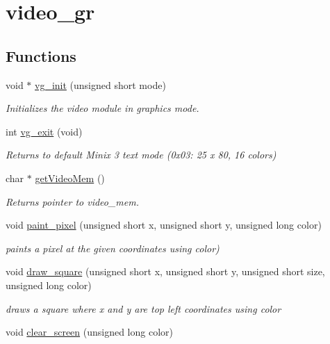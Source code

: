 \hypertarget{group__video__gr}{}\section{video\+\_\+gr}
\label{group__video__gr}
\subsection*{Functions}
\begin{DoxyCompactItemize}
\item 
void $\ast$ \hyperlink{group__video__gr_gacef21667c79365d57a084bed994c2189}{vg\+\_\+init} (unsigned short mode)
\begin{DoxyCompactList}\small\item\em Initializes the video module in graphics mode. \end{DoxyCompactList}\item 
int \hyperlink{group__video__gr_ga42f593e6656f1a978315aff02b1bcebf}{vg\+\_\+exit} (void)
\begin{DoxyCompactList}\small\item\em Returns to default Minix 3 text mode (0x03\+: 25 x 80, 16 colors) \end{DoxyCompactList}\item 
char $\ast$ \hyperlink{group__video__gr_ga225d3021cc002418d0191c705c9f7def}{get\+Video\+Mem} ()
\begin{DoxyCompactList}\small\item\em Returns pointer to video\+\_\+mem. \end{DoxyCompactList}\item 
void \hyperlink{group__video__gr_gab24ff8cf2062dab06f49c80bb6ea0d0b}{paint\+\_\+pixel} (unsigned short x, unsigned short y, unsigned long color)
\begin{DoxyCompactList}\small\item\em paints a pixel at the given coordinates using color) \end{DoxyCompactList}\item 
void \hyperlink{group__video__gr_gafe21a19735df3a4a83dbca30e9a9eb43}{draw\+\_\+square} (unsigned short x, unsigned short y, unsigned short size, unsigned long color)
\begin{DoxyCompactList}\small\item\em draws a square where x and y are top left coordinates using color \end{DoxyCompactList}\item 
void \hyperlink{group__video__gr_ga67d7471f389e3d640c38392647322abc}{clear\+\_\+screen} (unsigned long color)\hypertarget{group__video__gr_ga67d7471f389e3d640c38392647322abc}{}\label{group__video__gr_ga67d7471f389e3d640c38392647322abc}


\end{DoxyCompactItemize}
